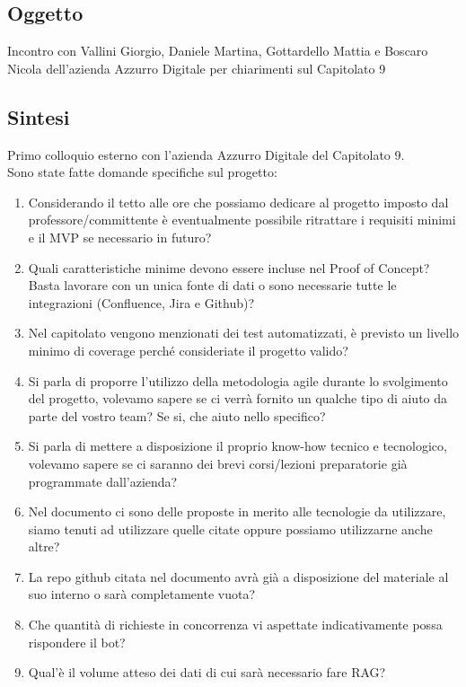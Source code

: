 \documentclass[12pt]{article}
\begin{document}
\subsection{Oggetto}
Incontro con Vallini Giorgio, Daniele Martina, Gottardello Mattia e Boscaro Nicola dell'azienda Azzurro Digitale per chiarimenti sul Capitolato 9
\subsection{Sintesi}
Primo colloquio esterno con l'azienda Azzurro Digitale del Capitolato 9.\\
\vspace{2mm}
Sono state fatte domande specifiche sul progetto:
\begin{enumerate}
\item Considerando il tetto alle ore che possiamo dedicare al progetto imposto dal professore/committente è eventualmente possibile ritrattare i requisiti minimi e il MVP se necessario in futuro?
\item Quali caratteristiche minime devono essere incluse nel Proof of Concept? Basta lavorare con un unica fonte di dati o sono necessarie tutte le integrazioni (Confluence, Jira e Github)?
\item Nel capitolato vengono menzionati dei test automatizzati, è previsto un livello minimo di coverage perché consideriate il progetto valido?
\item Si parla di proporre l'utilizzo della metodologia agile durante lo svolgimento del progetto, volevamo sapere se ci verrà fornito un qualche tipo di aiuto da parte del vostro team? Se si, che aiuto nello specifico? 
\item Si parla di mettere a disposizione il proprio know-how tecnico e tecnologico, volevamo sapere se ci saranno dei brevi corsi/lezioni preparatorie già programmate dall'azienda? 
\item Nel documento ci sono delle proposte in merito alle tecnologie da utilizzare, siamo tenuti ad utilizzare quelle citate oppure possiamo utilizzarne anche altre?
\item La repo github citata nel documento avrà già a disposizione del materiale al suo interno o sarà completamente vuota? 
\item Che quantità di richieste in concorrenza vi aspettate indicativamente possa rispondere il bot?
\item Qual’è il volume atteso dei dati di cui sarà necessario fare RAG?
\end{enumerate}
\end{document}
